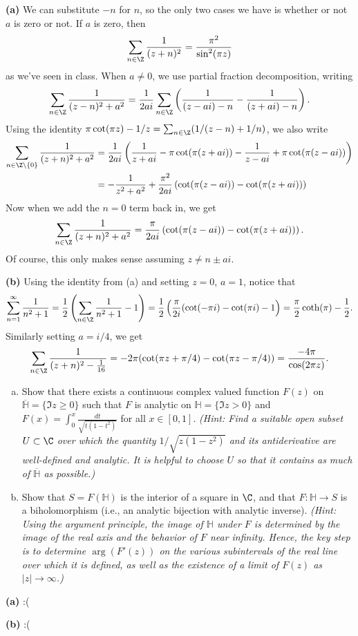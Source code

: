 \documentclass[11pt,letterpaper]{article}
\begin{document}
\begin{solution}
    \textbf{(a)} We can substitute $-n$ for $n$, so the only two cases we have is whether or not $a$ is zero or not. If $a$ is zero, then
    \[
        \sum_{n\in \Z}\frac{1}{(z+n)^2} = \frac{\pi^2}{\sin^2(\pi z)}
    \] 
    as we've seen in class. When $a\neq 0$, we use partial fraction decomposition, writing
    \[
        \sum_{n\in \Z} \frac{1}{(z-n)^2+a^2}=\frac{1}{2ai}\sum_{n\in \Z}\left(\frac{1}{(z-ai)-n}-\frac{1}{(z+ai)-n}\right).
    \] 
    Using the identity $\pi\cot(\pi z)-1/z=\sum_{n\in \Z}(1/(z-n)+1/n)$, we also write
    \[\begin{aligned}
        \sum_{n\in \Z\setminus \{0\}} \frac{1}{(z+n)^2+a^2}&=\frac{1}{2ai}\left(\frac{1}{z+ai}-\pi\cot(\pi(z+ai))-\frac{1}{z-ai}+\pi \cot(\pi (z-ai))\right)\\
                                                           &=-\frac{1}{z^2+a^2}+\frac{\pi^2}{2ai}\left(\cot(\pi(z-ai))-\cot(\pi(z+ai))\right)
    \end{aligned}\]
    Now when we add the $n=0$ term back in, we get 
    \[
        \sum_{n\in \Z}\frac{1}{(z+n)^2+a^2}=\frac{\pi}{2ai}\left(\cot(\pi(z-ai))-\cot(\pi(z+ai))\right).
    \] 
    Of course, this only makes sense assuming $z\neq n\pm ai$.

    \textbf{(b)} Using the identity from (a) and setting $z=0$, $a=1$, notice that
    \[
        \sum_{n=1}^\infty \frac{1}{n^2+1}=\frac12\left(\sum_{n\in \Z}\frac{1}{n^2+1}-1\right) = \frac12\left(\frac{\pi}{2i}(\cot(-\pi i)-\cot(\pi i)-1\right)=\frac{\pi}{2}\coth(\pi)-\frac12.
    \] 
    Similarly setting $a=i/4$, we get
    \[
        \sum_{n\in \Z}\frac{1}{(z+n)^2-\frac{1}{16}}=-2\pi(\cot(\pi z + \pi/4)-\cot(\pi z - \pi/4))=\frac{-4\pi}{\cos(2\pi z)}.
    \] 
\end{solution}

\begin{problem}\noindent
    \begin{enumerate}[(a)]
        \item Show that there exists a continuous complex valued function $F(z)$ on $\overline{\mathbb{H}}=\{\Im z\geq 0\}$ such that $F$ is analytic on $\mathbb{H}=\{\Im z>0\}$ and $F(x)=\displaystyle \int_0^x \frac{dt}{\sqrt{t(1-t^2)}}$ for all $x\in [0,1]$.
        \textit{(Hint: Find a suitable open subset $U\subset \C$ over which the quantity $1/\sqrt{z(1-z^2)}$ and its antiderivative are well-defined and analytic. It is helpful to choose $U$ so that it contains as much of $\overline{\mathbb{H}}$ as possible.)}
        \item Show that $S=F(\mathbb{H})$ is the interior of a square in $\C$, and that $F:\mathbb{H}\to S$ is a biholomorphism (i.e., an analytic bijection with analytic inverse).
        \textit{(Hint: Using the argument principle, the image of $\mathbb{H}$ under $F$ is determined by the image of the real axis and the behavior of $F$ near infinity.  Hence, the key step is to determine $\arg(F'(z))$ on the various subintervals of the real line over which it is defined, as well as the existence of a limit of $F(z)$ as $|z|\to\infty$.)}
    \end{enumerate}
\end{problem}

\begin{solution}
    \textbf{(a)} :(

    \textbf{(b)} :(
\end{solution}
\end{document}
